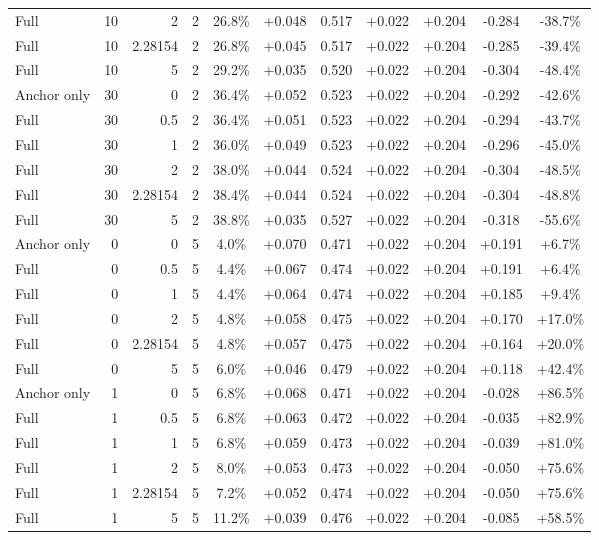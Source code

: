\begin{table}[htbp]
\begin{tabular}{lrrrccccccc}
Full & 10 & 2 & 2 & 26.8\% & +0.048 & 0.517 & +0.022 & +0.204 & -0.284 & -38.7\% \\
Full & 10 & 2.28154 & 2 & 26.8\% & +0.045 & 0.517 & +0.022 & +0.204 & -0.285 & -39.4\% \\
Full & 10 & 5 & 2 & 29.2\% & +0.035 & 0.520 & +0.022 & +0.204 & -0.304 & -48.4\% \\
Anchor only & 30 & 0 & 2 & 36.4\% & +0.052 & 0.523 & +0.022 & +0.204 & -0.292 & -42.6\% \\
Full & 30 & 0.5 & 2 & 36.4\% & +0.051 & 0.523 & +0.022 & +0.204 & -0.294 & -43.7\% \\
Full & 30 & 1 & 2 & 36.0\% & +0.049 & 0.523 & +0.022 & +0.204 & -0.296 & -45.0\% \\
Full & 30 & 2 & 2 & 38.0\% & +0.044 & 0.524 & +0.022 & +0.204 & -0.304 & -48.5\% \\
Full & 30 & 2.28154 & 2 & 38.4\% & +0.044 & 0.524 & +0.022 & +0.204 & -0.304 & -48.8\% \\
Full & 30 & 5 & 2 & 38.8\% & +0.035 & 0.527 & +0.022 & +0.204 & -0.318 & -55.6\% \\
Anchor only & 0 & 0 & 5 & 4.0\% & +0.070 & 0.471 & +0.022 & +0.204 & +0.191 & +6.7\% \\
Full & 0 & 0.5 & 5 & 4.4\% & +0.067 & 0.474 & +0.022 & +0.204 & +0.191 & +6.4\% \\
Full & 0 & 1 & 5 & 4.4\% & +0.064 & 0.474 & +0.022 & +0.204 & +0.185 & +9.4\% \\
Full & 0 & 2 & 5 & 4.8\% & +0.058 & 0.475 & +0.022 & +0.204 & +0.170 & +17.0\% \\
Full & 0 & 2.28154 & 5 & 4.8\% & +0.057 & 0.475 & +0.022 & +0.204 & +0.164 & +20.0\% \\
Full & 0 & 5 & 5 & 6.0\% & +0.046 & 0.479 & +0.022 & +0.204 & +0.118 & +42.4\% \\
Anchor only & 1 & 0 & 5 & 6.8\% & +0.068 & 0.471 & +0.022 & +0.204 & -0.028 & +86.5\% \\
Full & 1 & 0.5 & 5 & 6.8\% & +0.063 & 0.472 & +0.022 & +0.204 & -0.035 & +82.9\% \\
Full & 1 & 1 & 5 & 6.8\% & +0.059 & 0.473 & +0.022 & +0.204 & -0.039 & +81.0\% \\
Full & 1 & 2 & 5 & 8.0\% & +0.053 & 0.473 & +0.022 & +0.204 & -0.050 & +75.6\% \\
Full & 1 & 2.28154 & 5 & 7.2\% & +0.052 & 0.474 & +0.022 & +0.204 & -0.050 & +75.6\% \\
Full & 1 & 5 & 5 & 11.2\% & +0.039 & 0.476 & +0.022 & +0.204 & -0.085 & +58.5\% \\

\end{tabular}
\end{table}
